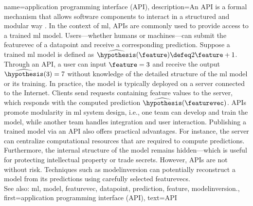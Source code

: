 {name={application programming interface (API)},
		description={An  API is a formal mechanism that 
			allows software components to interact in a structured and modular way \cite{RestfulBook2013}.
			In the context of \gls{ml}, APIs are commonly used to provide access to a trained \gls{ml} \gls{model}. 
			Users—whether humans or machines—can submit the \gls{featurevec} of a \gls{datapoint} and receive 
			a corresponding \gls{prediction}. Suppose a trained \gls{ml} \gls{model} is defined 
			as $\widehat{\hypothesis}(\feature) \defeq 2 \feature + 1$. Through an API, a user 
			can input $\feature = 3$ and receive the output $\widehat{\hypothesis}(3) = 7$ 
			without knowledge of the detailed structure of the \gls{ml} \gls{model} or its training. 
			In practice, the \gls{model} is typically deployed on a server connected to the Internet. 
			Clients send requests containing \gls{feature} values to the server, which responds with 
			the computed \gls{prediction} $\widehat{\hypothesis}(\featurevec)$. APIs promote modularity 
			in \gls{ml} system design, i.e., one team can develop and train the \gls{model}, while another team
			handles integration and user interaction. Publishing a trained \gls{model} via an API also 
			offers practical advantages. For instance, the server can centralize computational resources that 
			are required to compute \glspl{prediction}. Furthermore, the internal structure of the \gls{model} remains 
			hidden—which is useful for protecting intellectual property or trade secrets. 
			However, APIs are not without \gls{risk}. Techniques such as \gls{modelinversion} can potentially reconstruct a 
			\gls{model} from its \glspl{prediction} using carefully selected \glspl{featurevec}.
					\\
			See also: \gls{ml}, \gls{model}, \gls{featurevec}, \gls{datapoint}, \gls{prediction}, \gls{feature}, \gls{modelinversion}.},
		first={application programming interface (API)},
		text={API}
}

